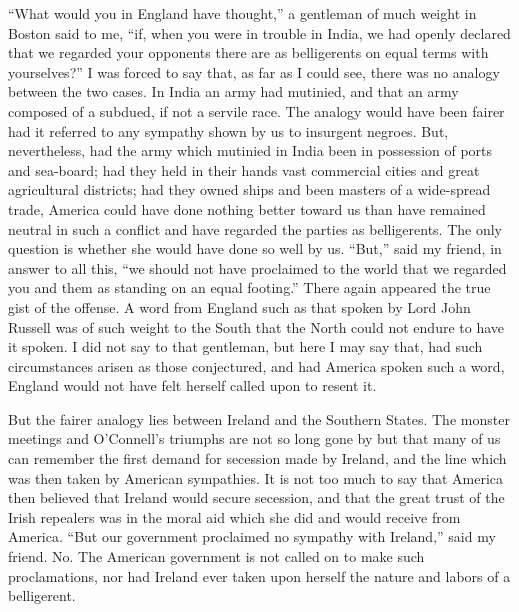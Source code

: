 ``What would you in England have thought,'' a gentleman of much
weight in Boston said to me, ``if, when you were in trouble in
India, we had openly declared that we regarded your opponents there
are as belligerents on equal terms with yourselves?''  I was forced
to say that, as far as I could see, there was no analogy between
the two cases.  In India an army had mutinied, and that an army
composed of a subdued, if not a servile race.  The analogy would
have been fairer had it referred to any sympathy shown by us to
insurgent negroes.  But, nevertheless, had the army which mutinied
in India been in possession of ports and sea-board; had they held
in their hands vast commercial cities and great agricultural
districts; had they owned ships and been masters of a wide-spread
trade, America could have done nothing better toward us than have
remained neutral in such a conflict and have regarded the parties
as belligerents.  The only question is whether she would have done
so well by us.  ``But,'' said my friend, in answer to all this, ``we
should not have proclaimed to the world that we regarded you and
them as standing on an equal footing.''  There again appeared the
true gist of the offense.  A word from England such as that spoken
by Lord John Russell was of such weight to the South that the North
could not endure to have it spoken.  I did not say to that
gentleman, but here I may say that, had such circumstances arisen
as those conjectured, and had America spoken such a word, England
would not have felt herself called upon to resent it.

But the fairer analogy lies between Ireland and the Southern
States.  The monster meetings and O'Connell's triumphs are not so
long gone by but that many of us can remember the first demand for
secession made by Ireland, and the line which was then taken by
American sympathies.  It is not too much to say that America then
believed that Ireland would secure secession, and that the great
trust of the Irish repealers was in the moral aid which she did and
would receive from America.  ``But our government proclaimed no
sympathy with Ireland,'' said my friend.  No.  The American
government is not called on to make such proclamations, nor had
Ireland ever taken upon herself the nature and labors of a
belligerent.

